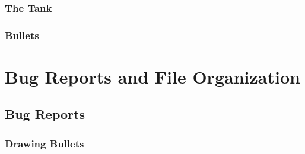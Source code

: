 \documentclass[11pt,letter,oneside]{report}
\begin{document}
\subsection{The Tank}

\subsection{Bullets}

\chapter{Bug Reports and File Organization}

\section{Bug Reports}

\subsection{Drawing Bullets}
\end{document}
